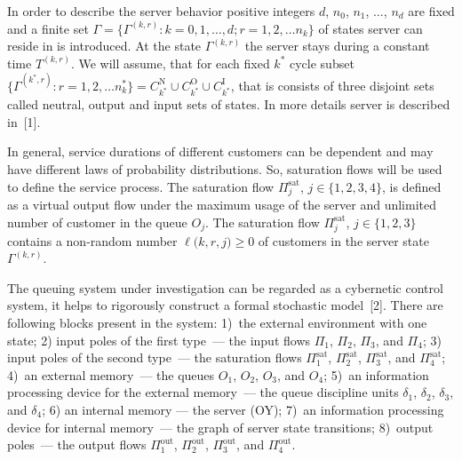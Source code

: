 In order to describe the server behavior positive integers $d$, $n_0$, $n_1$, $\ldots$,
$n_d$ are fixed and a finite set $\Gamma=\{\Gamma^{(k,r)} \colon k=0,1,\ldots,d; r=1,2,\ldots
n_k\}$ of states server can reside in is introduced. At the state $\Gamma^{(k,r)}$ the server stays during a constant 
time $T^{(k,r)}$. We will assume, that for each fixed $k^*$ cycle subset $\{\Gamma^{(k^*,r)} \colon r=1,2,\ldots
n_k^*\} = C_{k^*}^{\mathrm{N}} \cup  C_{k^*}^{\mathrm{O}} \cup  C_{k^*}^{\mathrm{I}}$, that is consists of three disjoint sets called neutral, output and input sets of states.  In more details server is described in~[1].

In general, service durations of different customers can be dependent and may have different laws of
probability distributions. So, saturation flows will be used to define the service process. The
saturation flow $\Pi^{\mathrm{\text{sat}}}_j$, $j \in \{1,2,3,4\}$, is defined as a virtual output
flow under the maximum usage of the server and unlimited number of customer in the queue $O_j$. The
saturation flow $\Pi^{\mathrm{\text{sat}}}_j$, $j\in \{1,2,3\}$ contains a non-random number
$\ell({k,r,j)}\geqslant0$ of customers in the server state $\Gamma^{(k,r)}$.





The queuing system under investigation can be regarded as a cybernetic control system, it helps to
rigorously construct a formal stochastic model~[2]. There are following blocks present in the system: 1)~the external
environment with one state; 2) input poles of the first type~--- the input flows $\Pi_1$, $\Pi_2$,
$\Pi_3$, and $\Pi_4$; 3) input poles of the second type~--- the saturation flows
$\Pi^{\mathrm{\text{sat}}}_1$, $\Pi^{\mathrm{\text{sat}}}_2$, $\Pi^{\mathrm{\text{sat}}}_3$, and
$\Pi^{\mathrm{\text{sat}}}_4$; 4)~an external memory~--- the queues $O_1$, $O_2$, $O_3$, and $O_4$;
5)~an information processing device for the external memory~--- the queue discipline units
$\delta_1$, $\delta_2$, $\delta_3$, and $\delta_4$; 6) an internal memory --- the server (OY); 7)~an
information processing device for internal memory~--- the graph of server state transitions;
8)~output poles~--- the output flows $\Pi^{\mathrm{\text{out}}}_1$, $\Pi^{\mathrm{\text{out}}}_2$,
$\Pi^{\mathrm{\text{out}}}_3$, and $\Pi^{\mathrm{\text{out}}}_4$. 

